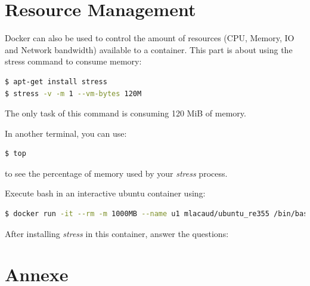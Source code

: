 \documentclass[a4paper,11pt]{exam}
\begin{document}
\section{Resource Management}
Docker can also be used to control the amount of resources (CPU, Memory, IO and Network bandwidth) available to a container. This part is about using the stress command to consume memory:
\begin{lstlisting}[frame=single,language={sh}]
$ apt-get install stress
$ stress -v -m 1 --vm-bytes 120M
\end{lstlisting}
The only task of this command is consuming 120 MiB of memory.

In another terminal, you can use: 
\begin{lstlisting}[frame=single,language={sh}]
$ top
\end{lstlisting}
to see the percentage of memory used by your \textit{stress} process.
\begin{questions}	
	\question Execute bash in an interactive ubuntu container using:
	\begin{lstlisting}[frame=single,language={sh}]
$ docker run -it --rm -m 1000MB --name u1 mlacaud/ubuntu_re355 /bin/bash
	\end{lstlisting}
	After installing \textit{stress} in this container, answer the questions:
	
\end{questions}

\section{Annexe}
\end{document}
